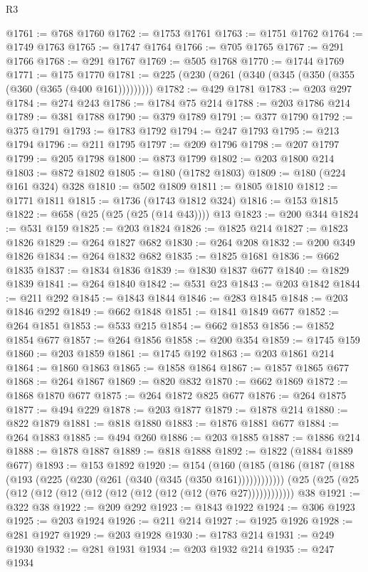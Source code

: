 \begin{lexlean}{R3}
\begin{coremodule}
@1761 := @768 @1760
@1762 := @1753 @1761
@1763 := @1751 @1762
@1764 := @1749 @1763
@1765 := @1747 @1764
@1766 := @705 @1765
@1767 := @291 @1766
@1768 := @291 @1767
@1769 := @505 @1768
@1770 := @1744 @1769
@1771 := @175 @1770
@1781 := @225 (@230 (@261 (@340 (@345 (@350 (@355 (@360 (@365 (@400 @161)))))))))
@1782 := @429 @1781
@1783 := @203 @297
@1784 := @274 @243
@1786 := @1784 @75 @214
@1788 := @203 @1786 @214
@1789 := @381 @1788
@1790 := @379 @1789
@1791 := @377 @1790
@1792 := @375 @1791
@1793 := @1783 @1792
@1794 := @247 @1793
@1795 := @213 @1794
@1796 := @211 @1795
@1797 := @209 @1796
@1798 := @207 @1797
@1799 := @205 @1798
@1800 := @873 @1799
@1802 := @203 @1800 @214
@1803 := @872 @1802
@1805 := @180 (@1782 @1803)
@1809 := @180 (@224 @161 @324) @328
@1810 := @502 @1809
@1811 := @1805 @1810
@1812 := @1771 @1811
@1815 := @1736 (@1743 @1812 @324)
@1816 := @153 @1815
@1822 := @658 (@25 (@25 (@25 (@14 @43)))) @13
@1823 := @200 @344
@1824 := @531 @159
@1825 := @203 @1824
@1826 := @1825 @214
@1827 := @1823 @1826
@1829 := @264 @1827 @682
@1830 := @264 @208
@1832 := @200 @349 @1826
@1834 := @264 @1832 @682
@1835 := @1825 @1681
@1836 := @662 @1835
@1837 := @1834 @1836
@1839 := @1830 @1837 @677
@1840 := @1829 @1839
@1841 := @264 @1840
@1842 := @531 @23
@1843 := @203 @1842
@1844 := @211 @292
@1845 := @1843 @1844
@1846 := @283 @1845
@1848 := @203 @1846 @292
@1849 := @662 @1848
@1851 := @1841 @1849 @677
@1852 := @264 @1851
@1853 := @533 @215
@1854 := @662 @1853
@1856 := @1852 @1854 @677
@1857 := @264 @1856
@1858 := @200 @354
@1859 := @1745 @159
@1860 := @203 @1859
@1861 := @1745 @192
@1863 := @203 @1861 @214
@1864 := @1860 @1863
@1865 := @1858 @1864
@1867 := @1857 @1865 @677
@1868 := @264 @1867
@1869 := @820 @832
@1870 := @662 @1869
@1872 := @1868 @1870 @677
@1875 := @264 @1872 @825 @677
@1876 := @264 @1875
@1877 := @494 @229
@1878 := @203 @1877
@1879 := @1878 @214
@1880 := @822 @1879
@1881 := @818 @1880
@1883 := @1876 @1881 @677
@1884 := @264 @1883
@1885 := @494 @260
@1886 := @203 @1885
@1887 := @1886 @214
@1888 := @1878 @1887
@1889 := @818 @1888
@1892 := @1822 (@1884 @1889 @677)
@1893 := @153 @1892
@1920 := @154
    (@160 (@185 (@186 (@187 (@188 (@193 (@225 (@230 (@261 (@340 (@345 (@350 @161))))))))))))
    (@25 (@25 (@25 (@12 (@12 (@12 (@12 (@12 (@12 (@12 (@12 (@76 @27))))))))))))
    @38
@1921 := @322 @38
@1922 := @209 @292
@1923 := @1843 @1922
@1924 := @306 @1923
@1925 := @203 @1924
@1926 := @211 @214
@1927 := @1925 @1926
@1928 := @281 @1927
@1929 := @203 @1928
@1930 := @1783 @214
@1931 := @249 @1930
@1932 := @281 @1931
@1934 := @203 @1932 @214
@1935 := @247 @1934

\end{coremodule}
\end{lexlean}
